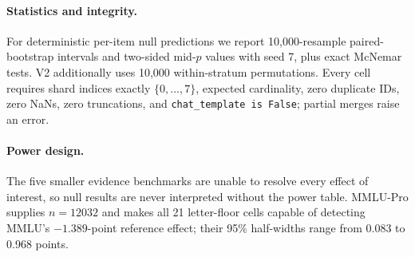 \paragraph{Statistics and integrity.}
For deterministic per-item null predictions we report 10,000-resample paired-bootstrap intervals and two-sided mid-$p$ values with seed 7, plus exact McNemar tests. V2 additionally uses 10,000 within-stratum permutations. Every cell requires shard indices exactly $\{0,\ldots,7\}$, expected cardinality, zero duplicate IDs, zero NaNs, zero truncations, and \texttt{chat\_template is False}; partial merges raise an error.

\paragraph{Power design.}
The five smaller evidence benchmarks are unable to resolve every effect of interest, so null results are never interpreted without the power table. MMLU-Pro supplies $n=12032$ and makes all 21 letter-floor cells capable of detecting MMLU's $-1.389$-point reference effect; their 95\% half-widths range from 0.083 to 0.968 points.


